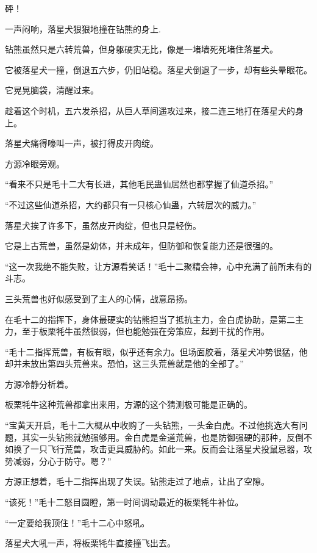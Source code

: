 
\begin{this_body}

砰！

一声闷响，落星犬狠狠地撞在钻熊的身上.

钻熊虽然只是六转荒兽，但身躯硬实无比，像是一堵墙死死堵住落星犬。

它被落星犬一撞，倒退五六步，仍旧站稳。落星犬倒退了一步，却有些头晕眼花。

它晃晃脑袋，清醒过来。

趁着这个时机，五六发杀招，从巨人草间遥攻过来，接二连三地打在落星犬的身上。

落星犬痛得嚎叫一声，被打得皮开肉绽。

方源冷眼旁观。

“看来不只是毛十二大有长进，其他毛民蛊仙居然也都掌握了仙道杀招。”

“不过这些仙道杀招，大约都只有一只核心仙蛊，六转层次的威力。”

落星犬挨了许多下，虽然皮开肉绽，但也只是轻伤。

它是上古荒兽，虽然是幼体，并未成年，但防御和恢复能力还是很强的。

“这一次我绝不能失败，让方源看笑话！”毛十二聚精会神，心中充满了前所未有的斗志。

三头荒兽也好似感受到了主人的心情，战意昂扬。

在毛十二的指挥下，身体最硬实的钻熊担当了抵抗主力，金白虎协助，是第二主力，至于板栗牦牛虽然很弱，但也能勉强在旁策应，起到干扰的作用。

“毛十二指挥荒兽，有板有眼，似乎还有余力。但场面胶着，落星犬冲势很猛，他却并未放出第四头荒兽来。恐怕，这三头荒兽就是他的全部了。”

方源冷静分析着。

板栗牦牛这种荒兽都拿出来用，方源的这个猜测极可能是正确的。

“宝黄天开启，毛十二大概从中收购了一头钻熊，一头金白虎。不过他挑选大有问题，其实一头钻熊就勉强够用。金白虎是金道荒兽，也是防御强硬的那种，反倒不如换了一只飞行荒兽，攻击更具威胁的。如此一来。反而会让落星犬投鼠忌器，攻势减弱，分心于防守。嗯？”

方源正想着，毛十二指挥出现了失误。钻熊走过了地点，让出了空隙。

“该死！”毛十二怒目圆瞪，第一时间调动最近的板栗牦牛补位。

“一定要给我顶住！”毛十二心中怒吼。

落星犬大吼一声，将板栗牦牛直接撞飞出去。


\end{this_body}

